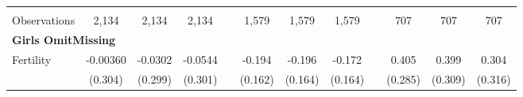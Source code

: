 \begin{landscape}
\begin{table}[htpb!]
\begin{center}
\begin{tabular}{lcccp{2mm}cccp{2mm}ccc}
\begin{footnotesize}\end{footnotesize}&\begin{footnotesize}\end{footnotesize}&\begin{footnotesize}\end{footnotesize}&\begin{footnotesize}\end{footnotesize}&\begin{footnotesize}\end{footnotesize}&\begin{footnotesize}\end{footnotesize}&\begin{footnotesize}\end{footnotesize}&\begin{footnotesize}\end{footnotesize}&\begin{footnotesize}\end{footnotesize}&\begin{footnotesize}\end{footnotesize}&\begin{footnotesize}\end{footnotesize}&\begin{footnotesize}\end{footnotesize}\\Observations&2,134&2,134&2,134&&1,579&1,579&1,579&&707&707&707\\
\multicolumn{12}{l}{\textbf{Girls OmitMissing}}\\ 
Fertility&-0.00360&-0.0302&-0.0544&&-0.194&-0.196&-0.172&&0.405&0.399&0.304\\
&(0.304)&(0.299)&(0.301)&&(0.162)&(0.164)&(0.164)&&(0.285)&(0.309)&(0.316)\\

\end{tabular}
\end{center}
\end{table}
\end{landscape}
